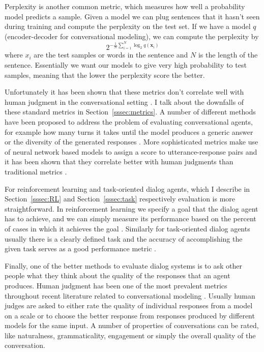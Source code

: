 \documentclass[12pt]{article}
\begin{document}
Perplexity \cite{Manning:1999} is another common metric, which measures how well a probability model predicts a sample. Given a model we can plug sentences that it hasn't seen during training and compute the perplexity on the test set. If we have a model \(q\) (encoder-decoder for conversational modeling), we can compute the perplexity by
\begin{equation}
2^{-\frac{1}{N}\sum_{i=1}^{N}\log_2{q(\bm{x}_i)}}
\end{equation}
where \(x_i\) are the test samples or words in the sentence and \(N\) is the length of the sentence. Essentially we want our models to give very high probability to test samples, meaning that the lower the perplexity score the better.

Unfortunately it has been shown that these metrics don't correlate well with human judgment in the conversational setting \cite{Liu:2016}. I talk about the downfalls of these standard metrics in Section~\ref{sssec:metrics}. A number of different methods have been proposed to address the problem of evaluating conversational agents, for example how many turns it takes until the model produces a generic answer \cite{Zhao:2017,Li_RL:2016} or the diversity of the generated responses \cite{Li_RL:2016}. More sophisticated metrics make use of neural network based models to assign a score to utterance-response pairs and it has been shown that they correlate better with human judgments than traditional metrics \cite{Lowe:2017,Tao:2017}.

For reinforcement learning and task-oriented dialog agents, which I describe in Section~\ref{sssec:RL} and Section~\ref{sssec:task} respectively evaluation is more straightforward. In reinforcement learning we specify a goal that the dialog agent has to achieve, and we can simply measure its performance based on the percent of cases in which it achieves the goal \cite{Li_adversarial:2017,Havrylov:2017}. Similarly for task-oriented dialog agents usually there is a clearly defined task and the accuracy of accomplishing the given task serves as a good performance metric \cite{Joshi:2017,Zhao:2017,Li_HIL:2016}.

Finally, one of the better methods to evaluate dialog systems is to ask other people what they think about the quality of the responses that an agent produces. Human judgment has been one of the most prevalent metrics throughout recent literature related to conversational modeling \cite{Shang:2015,Vinyals:2015,Zhou:2017,Li_RL:2016,Zhao:2017,Li_RL:2016,Li:2015}. Usually human judges are asked to either rate the quality of individual responses from a model on a scale or to choose the better response from responses produced by different models for the same input. A number of properties of conversations can be rated, like naturalness, grammaticality, engagement or simply the overall quality of the conversation.
\end{document}
